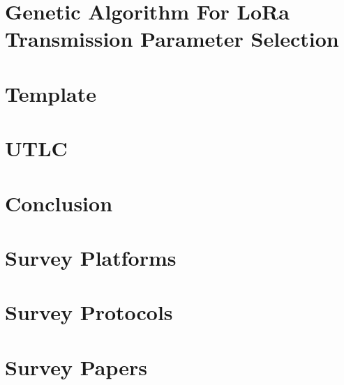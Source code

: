 \documentclass[conference]{../lib/styles/IEEEtran}
\begin{document}
\begin{refsection}
\chapter[06:''I know what to do and I go and execute'' - Usain Bolt]{Genetic Algorithm For LoRa Transmission Parameter Selection}
\chapter[07:''la patience fait fondre le marbre'' -- Amer]{Template}
\chapter[08*:''The misfortunes of one folk are the benefits of another'' - Mutanabbi]{UTLC}
\chapter[09:''Everything that has a beginning has an ending. Make your peace with that and all will be well'' - Jack Kornfield]{Conclusion}
\Appendix
\chapter[A:''In any conflict, discover the one who rubs his hands ... You'll see that it's never the one who fights !''  - Marc Roussel]{Survey Platforms}
	\onecolumn
\chapter[A:''In any conflict, discover the one who rubs his hands ... You'll see that it's never the one who fights !''  - Marc Roussel]{Survey Protocols}
	\onecolumn
\chapter[A:''In any conflict, discover the one who rubs his hands ... You'll see that it's never the one who fights !''  - Marc Roussel]{Survey Papers}

\end{refsection}
\end{document}
